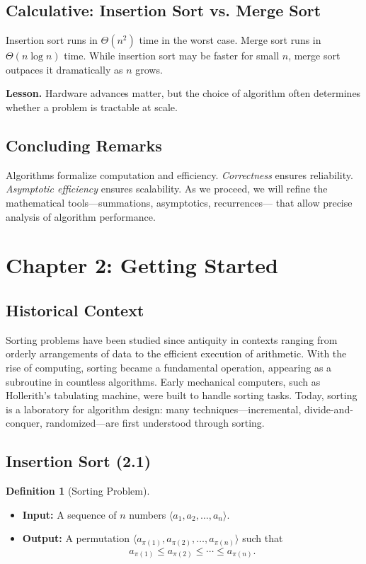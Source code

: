 \documentclass[12pt]{article}
\theoremstyle{definition}
\newtheorem{definition}{Definition}
\begin{document}
\subsection*{Calculative: Insertion Sort vs. Merge Sort}
Insertion sort runs in $\Theta(n^2)$ time in the worst case. Merge sort runs in 
$\Theta(n \log n)$ time. While insertion sort may be faster for small $n$, merge sort 
outpaces it dramatically as $n$ grows.

\textbf{Lesson.} Hardware advances matter, but the choice of algorithm often 
determines whether a problem is tractable at scale.

\subsection*{Concluding Remarks}
Algorithms formalize computation and efficiency. \emph{Correctness} ensures 
reliability. \emph{Asymptotic efficiency} ensures scalability. As we proceed, 
we will refine the mathematical tools---summations, asymptotics, recurrences---
that allow precise analysis of algorithm performance.

\newpage

\dotfill
\section*{Chapter 2: Getting Started}
\dotfill

\subsection*{Historical Context}
Sorting problems have been studied since antiquity in contexts ranging from 
orderly arrangements of data to the efficient execution of arithmetic. 
With the rise of computing, sorting became a fundamental operation, 
appearing as a subroutine in countless algorithms. Early mechanical 
computers, such as Hollerith’s tabulating machine, were built to handle 
sorting tasks. Today, sorting is a laboratory for algorithm design: many 
techniques---incremental, divide-and-conquer, randomized---are first 
understood through sorting.

\subsection*{Insertion Sort (2.1)}

\begin{definition}[Sorting Problem]
\leavevmode
\begin{itemize}
    \item \textbf{Input:} A sequence of $n$ numbers $\langle a_1, a_2, \dots, a_n \rangle$.
    \item \textbf{Output:} A permutation $\langle a_{\pi(1)}, a_{\pi(2)}, \dots, a_{\pi(n)} \rangle$ 
    such that 
    \[
        a_{\pi(1)} \leq a_{\pi(2)} \leq \cdots \leq a_{\pi(n)}.
    \]
\end{itemize}
\end{definition}
\end{document}
